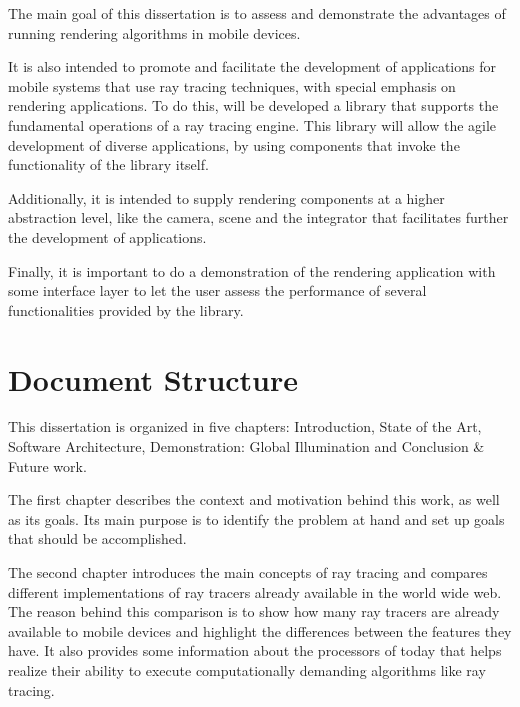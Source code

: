 \par
The main goal of this dissertation is to assess and demonstrate the advantages of running rendering algorithms in mobile devices.

\par
It is also intended to promote and facilitate the development of applications for mobile systems that use ray tracing techniques, with special emphasis on rendering applications.
To do this, will be developed a library that supports the fundamental operations of a ray tracing engine.
This library will allow the agile development of diverse applications, by using components that invoke the functionality of the library itself.

\par
Additionally, it is intended to supply rendering components at a higher abstraction level, like the camera, scene and the integrator that facilitates further the development of applications.

\par
Finally, it is important to do a demonstration of the rendering application with some interface layer to let the user assess the performance of several functionalities provided by the library.

\section{Document Structure}

\par
This dissertation is organized in five chapters: Introduction, State of the Art, Software Architecture, Demonstration: Global Illumination and Conclusion \& Future work.

\par
The first chapter describes the context and motivation behind this work, as well as its goals.
Its main purpose is to identify the problem at hand and set up goals that should be accomplished.

\par
The second chapter introduces the main concepts of ray tracing and compares different implementations of ray tracers already available in the world wide web.
The reason behind this comparison is to show how many ray tracers are already available to mobile devices and highlight the differences between the features they have.
It also provides some information about the processors of today that helps realize their ability to execute computationally demanding algorithms like ray tracing.

